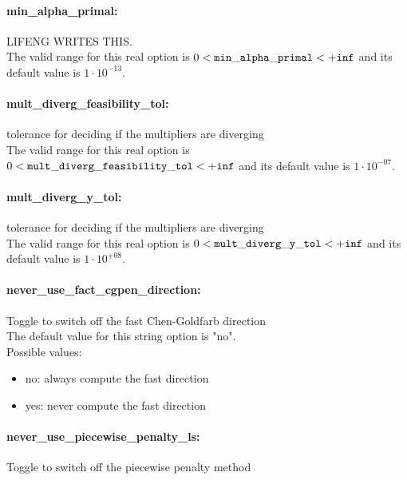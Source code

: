 \paragraph{min\_alpha\_primal:}\label{sec:min_alpha_primal} LIFENG WRITES THIS. $\;$ \\
 The valid range for this real option is 
$0 <  {\tt min\_alpha\_primal } <  {\tt +inf}$
and its default value is $1 \cdot 10^{-13}$.


\paragraph{mult\_diverg\_feasibility\_tol:}\label{sec:mult_diverg_feasibility_tol} tolerance for deciding if the multipliers are diverging $\;$ \\
 The valid range for this real option is 
$0 <  {\tt mult\_diverg\_feasibility\_tol } <  {\tt +inf}$
and its default value is $1 \cdot 10^{-07}$.


\paragraph{mult\_diverg\_y\_tol:}\label{sec:mult_diverg_y_tol} tolerance for deciding if the multipliers are diverging $\;$ \\
 The valid range for this real option is 
$0 <  {\tt mult\_diverg\_y\_tol } <  {\tt +inf}$
and its default value is $1 \cdot 10^{+08}$.


\paragraph{never\_use\_fact\_cgpen\_direction:}\label{sec:never_use_fact_cgpen_direction} Toggle to switch off the fast Chen-Goldfarb direction $\;$ \\

The default value for this string option is "no".
\\ 
Possible values:
\begin{itemize}
   \item no: always compute the fast direction
   \item yes: never compute the fast direction
\end{itemize}

\paragraph{never\_use\_piecewise\_penalty\_ls:}\label{sec:never_use_piecewise_penalty_ls} Toggle to switch off the piecewise penalty method $\;$ \\

